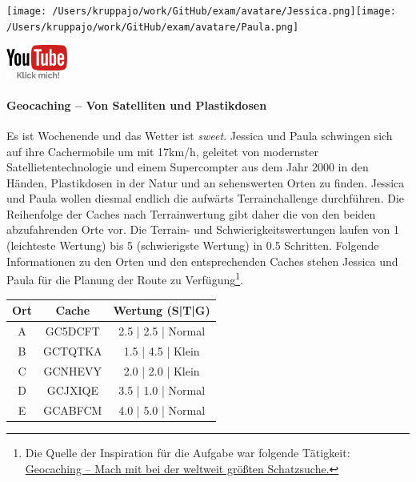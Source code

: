 \documentclass[a4paper, 9pt]{scrartcl}\usepackage[]{graphicx}\usepackage[]{xcolor}
\begin{document}
 
\ifcollection
\begin{flushright}
\tiny\vspace{-3Ex}
\textbf{\examinhaltstart}
\exammodulemathstat
\vspace{-4Ex}
\end{flushright}
\begin{minipage}[t]{0.5\textwidth}
\texttt{[image: /Users/kruppajo/work/GitHub/exam/avatare/Jessica.png]}\hspace{-4mm}\texttt{[image: /Users/kruppajo/work/GitHub/exam/avatare/Paula.png]}
\end{minipage}
\begin{minipage}[t]{0.5\textwidth}
\hfill
\href{https://youtu.be/3LAq3R0rS14}{\includegraphics[width = 2cm]{img/youtube}}
\end{minipage}
\fi



\ifcollection
\paragraph{Geocaching -- Von Satelliten und Plastikdosen}
\fi



Es ist Wochenende und das Wetter ist \textit{sweet}. Jessica und Paula schwingen sich auf ihre Cachermobile um mit 17km/h, geleitet von modernster Satellietentechnologie und einem Supercompter aus dem Jahr 2000 in den Händen, Plastikdosen in der Natur und an sehenswerten Orten zu finden. Jessica und Paula wollen diesmal endlich die aufwärts Terrainchallenge durchführen. Die Reihenfolge der Caches nach Terrainwertung gibt daher die von den beiden abzufahrenden Orte vor. Die Terrain- und Schwierigkeitswertungen laufen von 1 (leichteste Wertung) bis 5 (schwierigste Wertung) in 0.5 Schritten. Folgende Informationen zu den Orten und den entsprechenden Caches stehen Jessica und Paula für die Planung der Route zu Verfügung\footnote{Die Quelle der Inspiration für die Aufgabe war folgende Tätigkeit: \href{https://www.geocaching.com/play}{Geocaching -- Mach mit bei der weltweit größten Schatzsuche.}}.

\begin{center}
  \begin{tabular}{ ccc }
    \toprule
    Ort & Cache & Wertung (S|T|G) \\
    \midrule
    A & GC5DCFT & 2.5 | 2.5 | Normal \\
    B & GCTQTKA & 1.5 | 4.5 | Klein \\ 
    C & GCNHEVY & 2.0 | 2.0 | Klein \\ 
    D & GCJXIQE & 3.5 | 1.0 | Normal \\ 
    E & GCABFCM & 4.0 | 5.0 | Normal \\     
 \bottomrule
\end{tabular}
\end{center}
\end{document}
